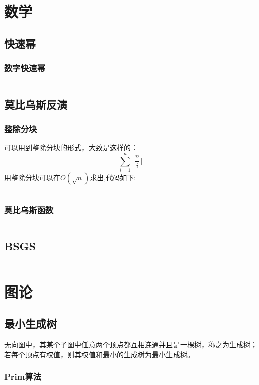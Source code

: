 \documentclass[a4paper,11pt]{article}
\begin{document}
\section{数学}

\subsection{快速幂}
\subsubsection{数字快速幂}
\inputminted[breaklines,linenos,frame=leftline]{c++}{math/quickpow1.cpp}

\subsection{莫比乌斯反演}
\subsubsection{整除分块}
可以用到整除分块的形式，大致是这样的：
$$\sum_{i=1}^n \lfloor \frac{n}{i} \rfloor $$
用整除分块可以在$O  (\sqrt{n})$求出,代码如下:
\inputminted[breaklines,linenos,frame=leftline]{c++}{math/RemoveTheBlock.cpp}
\subsubsection{莫比乌斯函数}
\inputminted[breaklines,linenos,frame=leftline]{c++}{math/MobiusFunction.cpp}

\subsection{BSGS}
\inputminted[breaklines,linenos,frame=leftline]{c++}{math/BSGS.cpp}

\newpage
\section{图论} %
\subsection{最小生成树} %
无向图中，其某个子图中任意两个顶点都互相连通并且是一棵树，称之为生成树；若每个顶点有权值，则其权值和最小的生成树为最小生成树。
\subsubsection{Prim算法}
\inputminted[breaklines,linenos,frame=leftline]{c++}{graph/prim.cpp}
\end{document}
